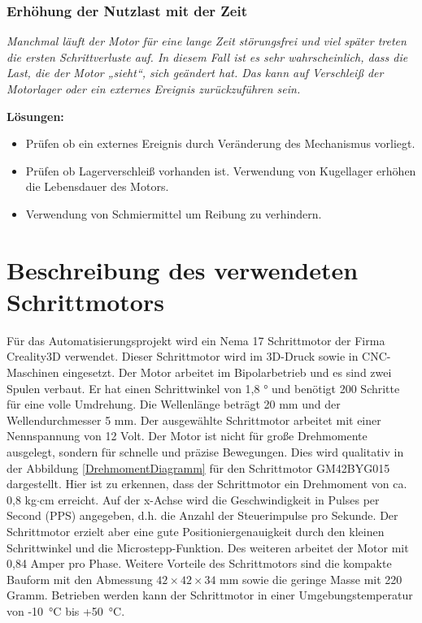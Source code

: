 {{{			\subsubsection{Erhöhung der Nutzlast mit der Zeit}
			\textit{\glqq Manchmal läuft der Motor für eine lange Zeit störungsfrei und viel später treten die ersten Schrittverluste auf. In diesem Fall ist es sehr wahrscheinlich, dass die Last, die der Motor „sieht“, sich geändert hat. Das kann auf Verschleiß der Motorlager oder ein externes Ereignis zurückzuführen sein.\grqq}\cite{Faulhaber:2020}
			
			\textbf{Lösungen:}
			\begin{itemize}
				\item Prüfen ob ein externes Ereignis durch Veränderung des Mechanismus vorliegt.
				\item Prüfen ob Lagerverschleiß vorhanden ist. Verwendung von Kugellager erhöhen die Lebensdauer des Motors.
				\item Verwendung von Schmiermittel um Reibung zu verhindern.
			\end{itemize}
			
			
			\section{Beschreibung des verwendeten Schrittmotors}
			
			Für das Automatisierungsprojekt wird ein Nema 17 Schrittmotor der Firma Creality3D verwendet. Dieser Schrittmotor wird im 3D-Druck sowie in CNC-Maschinen eingesetzt. Der Motor arbeitet im Bipolarbetrieb und es sind zwei Spulen verbaut. Er hat einen Schrittwinkel von 1,8 ° und benötigt 200 Schritte für eine volle Umdrehung. Die Wellenlänge beträgt 20 mm und der Wellendurchmesser 5 mm. Der ausgewählte Schrittmotor arbeitet mit einer Nennspannung von 12 Volt. Der Motor ist nicht für große Drehmomente ausgelegt, sondern für schnelle und präzise Bewegungen.  Dies wird qualitativ in der Abbildung \ref{DrehmomentDiagramm} für den Schrittmotor GM42BYG015 dargestellt. Hier ist zu erkennen, dass der Schrittmotor ein Drehmoment von ca. 0,8 kg$\cdot$cm erreicht. Auf der x-Achse wird die Geschwindigkeit in Pulses per Second (PPS) angegeben, d.h. die Anzahl der Steuerimpulse pro Sekunde. Der Schrittmotor erzielt aber eine gute Positioniergenauigkeit durch den kleinen Schrittwinkel und die Microstepp-Funktion. Des weiteren arbeitet der Motor mit 0,84 Amper pro Phase. Weitere Vorteile des Schrittmotors sind die kompakte Bauform mit den Abmessung $42\times 42\times 34$ mm sowie die geringe Masse mit 220 Gramm. Betrieben werden kann der Schrittmotor in einer Umgebungstemperatur von -10\ °C bis +50\ °C.\cite{Gems:2014,Gems:2022}
			
}}}
